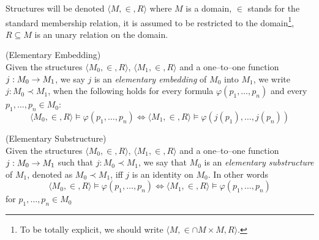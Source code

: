 Structures will be denoted $\langle M, \in, R \rangle$ where $M$ is a domain, $\in$ stands for the standard membership relation, it is assumed to be restricted to the domain\footnote{To be totally explicit, we should write $\langle M, \in \cap M \times M, R \rangle$.}, $R \subseteq M$ is an unary relation on the domain. 

\begin{definition}{(Elementary Embedding)}\label{def:elementary_embedding}\\
Given the structures $\langle M_0, \in, R \rangle$, $\langle M_1, \in, R \rangle$ and a one–to–one function $j: M_0 \rightarrow M_1$, we say $j$ is an \emph{elementary embedding} of $M_0$ into $M_1$, we write $j: M_0 \prec M_1$, when the following holds for every formula $\varphi(p_1, \ldots, p_n)$ and every $p_1, \ldots, p_n \in M_0$:
\begin{equation}
\langle M_0, \in, R \rangle \models \varphi(p_1, \ldots, p_n) \iff \langle M_1, \in, R \rangle  \models \varphi(j(p_1), \ldots, j(p_n))
\end{equation}
\end{definition}


\begin{definition}{(Elementary Substructure)}\label{def:elementary_substructure}\\
Given the structures $\langle M_0, \in, R \rangle$, $\langle M_1, \in, R \rangle$ and a one–to–one function $j: M_0 \rightarrow M_1$ such that $j: M_0 \prec M_1$, we say that $M_0$ is an \emph{elementary substructure} of $M_1$, denoted as $M_0 \prec M_1$, iff $j$ is an identity on $M_0$. In other words
\begin{equation}
\langle M_0, \in, R \rangle \models \varphi(p_1, \ldots, p_n) \iff \langle M_1, \in, R \rangle  \models \varphi(p_1, \ldots, p_n)
\end{equation}
for $p_1, \ldots, p_n \in M_0$
\end{definition}
